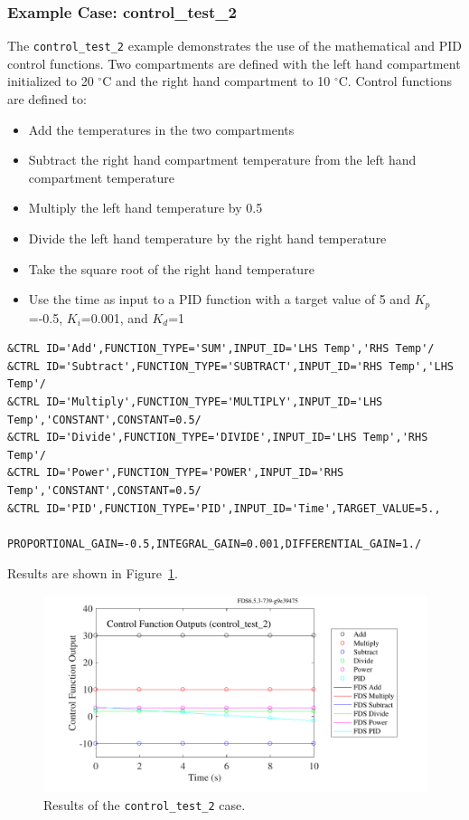 \documentclass[11pt]{book}
\newcommand{\ct}{\tt\small}
\begin{document}
\subsubsection{Example Case: control\_test\_2 }

The {\ct control\_test\_2} example demonstrates the use of the mathematical and PID control functions.  Two compartments are defined with the left hand compartment initialized to 20 $^\circ$C and the right hand compartment to 10 $^\circ$C.    Control functions are defined to:

\begin{itemize}
\item Add the temperatures in the two compartments
\item Subtract the right hand compartment temperature from the left hand compartment temperature
\item Multiply the left hand temperature by 0.5
\item Divide the left hand temperature by the right hand temperature
\item Take the square root of the right hand temperature
\item Use the time as input to a PID function with a target value of 5 and $K_p$=-0.5, $K_i$=0.001, and $K_d$=1
\end{itemize}

\footnotesize
\begin{verbatim}
&CTRL ID='Add',FUNCTION_TYPE='SUM',INPUT_ID='LHS Temp','RHS Temp'/
&CTRL ID='Subtract',FUNCTION_TYPE='SUBTRACT',INPUT_ID='RHS Temp','LHS Temp'/
&CTRL ID='Multiply',FUNCTION_TYPE='MULTIPLY',INPUT_ID='LHS Temp','CONSTANT',CONSTANT=0.5/
&CTRL ID='Divide',FUNCTION_TYPE='DIVIDE',INPUT_ID='LHS Temp','RHS Temp'/
&CTRL ID='Power',FUNCTION_TYPE='POWER',INPUT_ID='RHS Temp','CONSTANT',CONSTANT=0.5/
&CTRL ID='PID',FUNCTION_TYPE='PID',INPUT_ID='Time',TARGET_VALUE=5.,
          PROPORTIONAL_GAIN=-0.5,INTEGRAL_GAIN=0.001,DIFFERENTIAL_GAIN=1./
\end{verbatim}
\normalsize

\noindent Results are shown in Figure~\ref{control_test_2_fig}.
\begin{figure}[ht]
\centering
\includegraphics[scale=0.55]{SCRIPT_FIGURES/control_test_2}
\caption[Results of the {\ct control\_test\_2} case]{Results of the {\ct control\_test\_2} case.}
\label{control_test_2_fig}
\end{figure}
\end{document}
